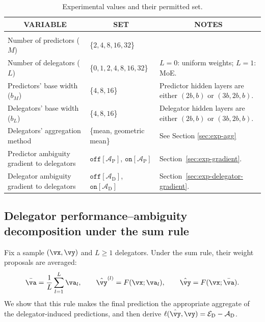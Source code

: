 \documentclass[10pt]{article} %
\newcommand{\dambiguity}{\mathcal{A}_{\mathrm{D}}}
\newcommand{\pambiguity}{\mathcal{A}_{\mathrm{P}}}
\newcommand{\dperformance}{\mathcal{E}_{\mathrm{D}}}
\newcommand{\ambiguityon}[1]{\ensuremath{\mathtt{on}[#1]}}
\newcommand{\ambiguityoff}[1]{\ensuremath{\mathtt{off}[#1]}}
\begin{document}
\begin{table}[t]
\caption{Experimental values and their permitted set.}
\label{tab:experiment-parameters}
\begin{center}
\begin{tabular}{lll}
\multicolumn{1}{c}{\bf VARIABLE}
&
\multicolumn{1}{c}{\bf SET}
&
\multicolumn{1}{c}{\bf NOTES}
\\ \hline \\
Number of predictors ($M$) & \{$2, 4, 8, 16, 32$\} &  \\
Number of delegators ($L$) & \{$0, 1, 2, 4, 8, 16, 32$\} &  $L=0$: uniform weights; $L=1$: MoE. \\
Predictors' base width ($b_M$) & \{$4, 8, 16$\} & Predictor hidden layers are either $(2b,b)$ or $(3b,2b,b)$.  \\
Delegators' base width ($b_L$) & \{$4, 8, 16$\} & Delegator hidden layers are either $(2b,b)$ or $(3b,2b,b)$. \\
Delegators' aggregation method & \{mean, geometric mean\} & See Section \ref{sec:exp-agg} \\
Predictor ambiguity gradient to delegators & \ambiguityoff{\pambiguity}, \ambiguityon{\pambiguity} & Section~\ref{sec:exp-gradient}. \\
Delegator ambiguity gradient to delegators & \ambiguityoff{\dambiguity}, \ambiguityon{\dambiguity} & Section~\ref{sec:exp-delegator-gradient}. \\
\end{tabular}
\end{center}
\end{table}

 

\subsection{Delegator performance--ambiguity decomposition under the sum rule}\label{ap:delegator-decomposition}

Fix a sample $(\vx,\vy)$ and $L\geq 1$ delegators. Under the sum rule, their weight proposals are averaged:
\begin{equation}
    \bar{\va}=\frac{1}{L}\sum_{l=1}^L\va_l,
    \qquad
    \hat{\vy}^{(l)}=F(\vx;\va_l),
    \qquad 
    \hat{\vy}=F(\vx;\bar{\va}).
\end{equation}
We show that this rule makes the final prediction the appropriate aggregate of the delegator-induced predictions, and then derive $\ell(\hat{\vy},\vy)=\dperformance-\dambiguity$.
\end{document}
